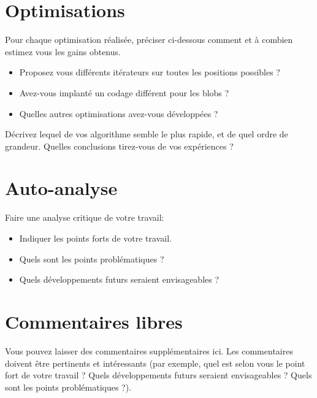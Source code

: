 \documentclass[a4paper, 11pt]{article}
\begin{document}
\vspace*{3cm}

\newpage
\section{Optimisations}
Pour chaque optimisation réalisée, préciser ci-dessous comment et à combien estimez vous les
gains obtenus.
\begin{itemize}
\item Proposez vous différents itérateurs sur toutes les positions possibles ?
\vspace{1cm}
\item Avez-vous implanté un codage différent pour les blobs ?
\vspace{1cm}
\item Quelles autres optimisations avez-vous développées ?
\end{itemize}
\vspace{2cm}
Décrivez lequel de vos algorithme semble le plus rapide, et de quel ordre de grandeur.
Quelles conclusions tirez-vous de vos expériences ?
\vspace{2cm}





\section{Auto-analyse}

Faire une analyse critique de votre travail:\\
\begin{itemize}
\item Indiquer les points forts de votre travail.
\vspace{1cm}
\item Quels sont les points problématiques ?
\vspace{1cm}
\item Quels développements futurs seraient envisageables ?
\vspace{1cm}
\end{itemize}


\section{Commentaires libres}

Vous pouvez laisser des commentaires supplémentaires ici. Les commentaires
doivent être pertinents et intéressants (par exemple, quel est selon vous
le point fort de votre travail ? Quels développements futurs seraient
envisageables ? Quels sont les points problématiques ?).
\end{document}
